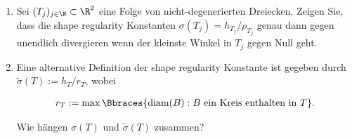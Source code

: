 
\begin{exercise}

\phantom{}

\begin{enumerate}[label = \textbf{\alph*)}]

  \item Sei $(T_j)_{j \in \N} \subset \R^2$ eine Folge von nicht-degenerierten Dreiecken.
  Zeigen Sie, dass die shape regularity Konstanten $\sigma(T_j) = h_{T_j} / \rho_{T_j}$ genau dann gegen unendlich divergieren wenn der kleinste Winkel in $T_j$ gegen Null geht.

  \item Eine alternative Definition der shape regularity Konstante ist gegeben durch $\tilde{\sigma}(T) := h_T / r_T$, wobei

  \begin{align*}
    r_T := \max
    \Bbraces
    {
      \text{diam}(B):
      B ~\text{ein Kreis enthalten in}~ T
    }.
  \end{align*}

  Wie hängen $\sigma(T)$ und $\tilde{\sigma}(T)$ zusammen?

\end{enumerate}

\end{exercise}



